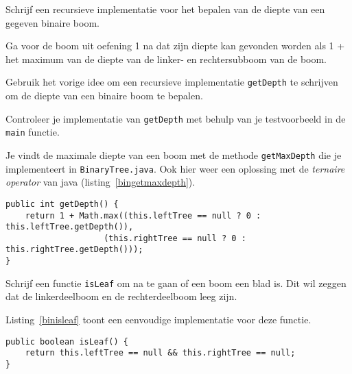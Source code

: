 \begin{oef}
\code Schrijf een recursieve implementatie voor het bepalen van de diepte van een gegeven binaire boom. 
\begin{oefenumerate}
	\item Ga voor de boom uit oefening 1 na dat zijn diepte kan gevonden worden als 1 + het maximum van de diepte van de linker- en rechtersubboom van de boom.
	\item Gebruik het vorige idee om een recursieve implementatie \verb=getDepth= te schrijven om de diepte van een binaire boom te bepalen.
	\item Controleer je implementatie van \verb=getDepth= met behulp van je testvoorbeeld in de \verb=main= functie.
\end{oefenumerate}
\begin{opl}
Je vindt de maximale diepte van een boom met de methode \verb+getMaxDepth+ die je implementeert in \verb+BinaryTree.java+. Ook hier weer een oplossing met de \emph{ternaire operator} van java (listing~\ref{bingetmaxdepth}).
\begin{lstlisting}[caption={De diepte van een binaire boom}, label=bingetmaxdepth]
public int getDepth() {
	return 1 + Math.max((this.leftTree == null ? 0 : this.leftTree.getDepth()), 
					(this.rightTree == null ? 0 : this.rightTree.getDepth()));
}
\end{lstlisting}

\end{opl}
\end{oef}


\begin{oef}
\code Schrijf een functie \verb=isLeaf= om na te gaan of een boom een blad is. Dit wil zeggen dat de linkerdeelboom en de rechterdeelboom leeg zijn.
\begin{opl}
Listing~\ref{binisleaf} toont een eenvoudige implementatie voor deze functie.
\begin{lstlisting}[caption={Is een knoop een blad?}, label=binisleaf]
public boolean isLeaf() {
	return this.leftTree == null && this.rightTree == null;
}
\end{lstlisting}
\end{opl}
\end{oef}




